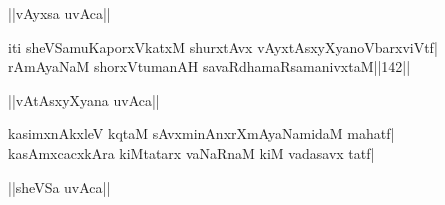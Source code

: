 \documentclass{article}
\begin{document}
\begin{center}
||vAyxsa uvAca||
\end{center}

iti sheVSamuKaporxVkatxM shurxtAvx vAyxtAsxyXyanoVbarxviVtf|\\
rAmAyaNaM shorxVtumanAH savaRdhamaRsamanivxtaM||142||\\

\begin{center}
||vAtAsxyXyana uvAca||
\end{center}

kasimxnAkxleV kqtaM sAvxminAnxrXmAyaNamidaM mahatf|\\
kasAmxcacxkAra kiMtatarx vaNaRnaM kiM vadasavx tatf|\\

\begin{center}
||sheVSa uvAca||
\end{center}
\end{document}
